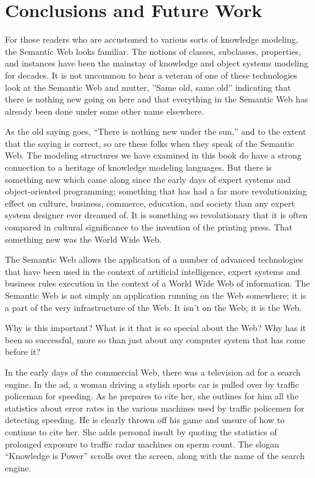 \chapter{Conclusions and Future Work}
\label{ch17}



For those readers who are accustomed to various sorts of knowledge
modeling, the Semantic Web looks familiar. The notions of classes,
subclasses, properties, and instances have been the mainstay of
knowledge and object systems modeling for decades. It is not
uncommon to hear a veteran of one of these technologies look at the
Semantic Web and mutter, ''Same old, same old'' indicating that there
is nothing new going on here and that everything in the Semantic Web has
already been done under some other name elsewhere.

As the old saying goes, ``There is nothing new under the sun,'' and to
the extent that the saying is correct, so are these folks when they
speak of the Semantic Web. The modeling structures we have examined in
this book do have a strong connection to a heritage of knowledge
modeling languages. But there is something new which came along since
the early days of expert systems and object-oriented programming;
something that has had a far more revolutionizing effect on culture,
business, commerce, education, and society than any expert system
designer ever dreamed of. It is something so revolutionary that it is
often compared in cultural significance to the invention of the printing
press. That something new was the World Wide Web.

The Semantic Web allows the application of a number of advanced technologies that have
been used in the context of artificial intelligence, expert systems and
business rules execution in the context of a World Wide Web of
information. The Semantic Web is not simply an application running on
the Web somewhere; it is a part of the very infrastructure of the Web.
It isn't on the Web; it is the Web.

Why is this important? What is it that is so special about the Web? Why
has it been so successful, more so than just about any computer system
that has come before it?

In the early days of the commercial Web, there was a television ad for a
search engine. In the ad, a woman driving a stylish sports car is pulled
over by traffic policeman for speeding. As he prepares to cite her, she
outlines for him all the statistics about error rates in the various
machines used by traffic policemen for detecting speeding. He is clearly
thrown off his game and unsure of how to continue to cite her. She adds
personal insult by quoting the statistics of prolonged exposure to
traffic radar machines on sperm count. The slogan ``Knowledge is Power''
scrolls over the screen, along with the name of the search engine.

